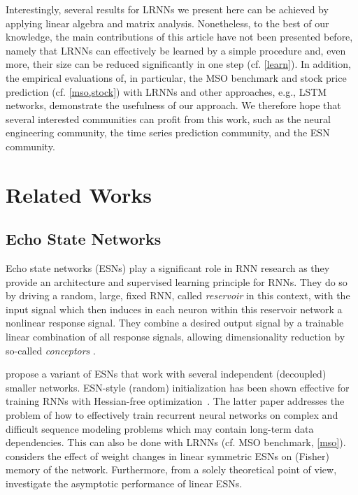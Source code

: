 \documentclass[twoside,11pt]{article}
\theoremstyle{definition}
\begin{document}
Interestingly, several results for LRNNs we present here can be achieved by
applying linear algebra and matrix analysis. Nonetheless, to the best of our
knowledge, the main contributions of this article have not been presented
before, namely that LRNNs can effectively be learned by a simple procedure and,
even more, their size can be reduced significantly in one step (cf.
\cref{learn}). In addition, the empirical evaluations of, in particular, the MSO
benchmark and stock price prediction (cf. \cref{mso,stock}) with LRNNs and other
approaches, e.g., LSTM networks, demonstrate the usefulness of our approach. We
therefore hope that several interested communities can profit from this work,
such as the neural engineering community, the time series prediction community,
and the ESN community.

\section{Related Works}\label{related}

\subsection{Echo State Networks}

Echo state networks (ESNs) \citep{JH04,Jae07} play a significant role in RNN
research as they provide an architecture and supervised learning principle for
RNNs. They do so by driving a random, large, fixed RNN, called \emph{reservoir}
in this context, with the input signal which then induces in each neuron within
this reservoir network a nonlinear response signal. They combine a desired
output signal by a trainable linear combination of all response signals,
allowing dimensionality reduction by so-called \emph{conceptors} \citep{Jae14,Jae17}.

\citet{XYH07} propose a variant of ESNs that work with several independent
(decoupled) smaller networks. ESN-style (random) initialization has been shown
effective for training RNNs with Hessian-free optimization~\citep{MS11}. The
latter paper addresses the problem of how to effectively train recurrent neural
networks on complex and difficult sequence modeling problems which may contain
long-term data dependencies. This can also be done with LRNNs (cf. MSO
benchmark, \cref{mso}).
\citet{Tin18} considers the effect of weight changes in linear symmetric ESNs on
(Fisher) memory of the network. Furthermore, from a solely theoretical point of view,
\citet{CW+16} investigate the asymptotic performance of linear ESNs.
\end{document}
